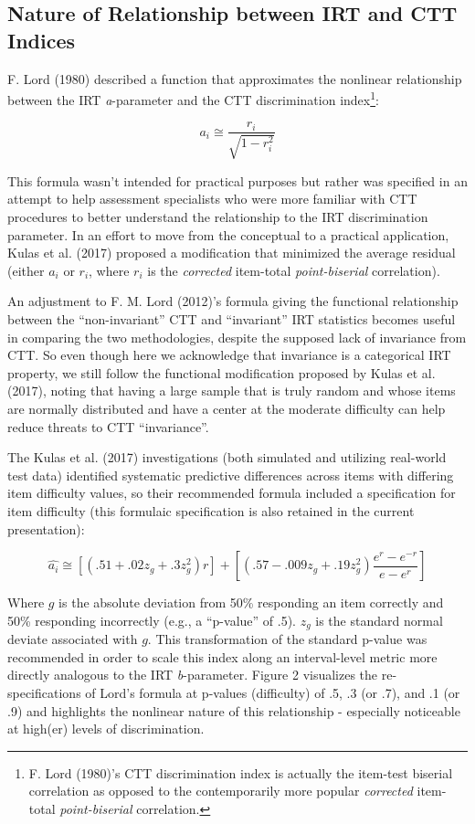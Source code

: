 \documentclass[
  man]{apa6}
\begin{document}
\hypertarget{nature-of-relationship-between-irt-and-ctt-indices}{%
\subsection{Nature of Relationship between IRT and CTT Indices}\label{nature-of-relationship-between-irt-and-ctt-indices}}

F. Lord (1980) described a function that approximates the nonlinear relationship between the IRT \emph{a}-parameter and the CTT discrimination index\footnote{F. Lord (1980)'s CTT discrimination index is actually the item-test biserial correlation as opposed to the contemporarily more popular \emph{corrected} item-total \emph{point-biserial} correlation.}:

\[a_i\cong \frac{r_i}{\sqrt{1-r_i^2}}\]

This formula wasn't intended for practical purposes but rather was specified in an attempt to help assessment specialists who were more familiar with CTT procedures to better understand the relationship to the IRT discrimination parameter. In an effort to move from the conceptual to a practical application, Kulas et al. (2017) proposed a modification that minimized the average residual (either \(a_i\) or \(r_i\), where \(r_i\) is the \emph{corrected} item-total \emph{point-biserial} correlation).

An adjustment to F. M. Lord (2012)'s formula giving the functional relationship between the ``non-invariant'' CTT and ``invariant'' IRT statistics becomes useful in comparing the two methodologies, despite the supposed lack of invariance from CTT. So even though here we acknowledge that invariance is a categorical IRT property, we still follow the functional modification proposed by Kulas et al. (2017), noting that having a large sample that is truly random and whose items are normally distributed and have a center at the moderate difficulty can help reduce threats to CTT ``invariance''.

The Kulas et al. (2017) investigations (both simulated and utilizing real-world test data) identified systematic predictive differences across items with differing item difficulty values, so their recommended formula included a specification for item difficulty (this formulaic specification is also retained in the current presentation):

\[\hat{a_i}\cong[(.51 + .02z_g + .3z_g^2)r]+[(.57 - .009z_g + .19z_g^2)\frac{e^r-e^{-r}}{e-e^r}]\]

Where \(g\) is the absolute deviation from 50\% responding an item correctly and 50\% responding incorrectly (e.g., a ``p-value'' of .5). \(z_g\) is the standard normal deviate associated with \(g\). This transformation of the standard p-value was recommended in order to scale this index along an interval-level metric more directly analogous to the IRT \emph{b}-parameter. Figure 2 visualizes the re-specifications of Lord's formula at p-values (difficulty) of .5, .3 (or .7), and .1 (or .9) and highlights the nonlinear nature of this relationship - especially noticeable at high(er) levels of discrimination.
\end{document}
